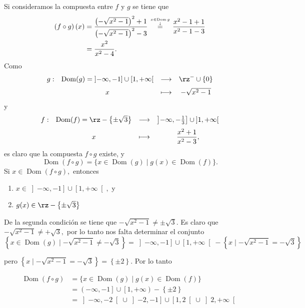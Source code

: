 \begin{sol}
Si consideramos la compuesta entre $f$ y $g$ se tiene que
\begin{align*}
\left(  f\circ g\right)  \left(  x\right)   &  =\dfrac{\left(  -\sqrt{x^{2}%
-1}\right)  ^{2}+1}{\left(  -\sqrt{x^{2}-1}\right)  ^{2}-3}\overset{%
\genfrac{}{}{0pt}{}{x\in\operatorname*{Dom}g}{\downarrow}%
}{=}\frac{x^{2}-1+1}{x^{2}-1-3}\\
&  =\frac{x^{2}}{x^{2}-4}.
\end{align*}
Como
\[%
\begin{array}
[c]{cccc}%
g: & \operatorname*{Dom}(g)=\left]  -\infty,-1\right]  \cup\left[
1,+\infty\right[  & \longrightarrow & \rz^{-}\cup\left\{  0\right\} \\
\vspace{-0.2cm} &  &  & \\
& x & \longmapsto & -\sqrt{x^{2}-1}%
\end{array}
\]
y
\[%
\begin{array}
[c]{cccc}%
f: & \operatorname*{Dom}(f)=\rz-\left\{  \pm\sqrt{3}\right\}  &
\longrightarrow & \left]  -\infty,-\frac{1}{3}\right]  \cup\left]
1,+\infty\right[ \\
\vspace{-0.2cm} &  &  & \\
& x & \longmapsto & \dfrac{x^{2}+1}{x^{2}-3},
\end{array}
\]
es claro que la compuesta $f\circ g$ existe, y%
\[
\operatorname*{Dom}\left(  f\circ g\right)  =\{x\in\operatorname*{Dom}(g)\mid
g(x)\in\operatorname*{Dom}(f)\}.
\]
Si $x\in\operatorname*{Dom}\left(  f\circ g\right)  ,$ entonces

\begin{enumerate}
\item $x\in\left]  -\infty,-1\right]  \cup\left[  1,+\infty\right[  ,$ y

\item $g(x)\in\rz-\left\{  \pm\sqrt{3}\right\}  $
\end{enumerate}

De la segunda condici\'{o}n se tiene que $-\sqrt{x^{2}-1}\neq\pm\sqrt{3}.$ Es
claro que $-\sqrt{x^{2}-1}\neq+\sqrt{3},$ por lo tanto nos falta determinar el
conjunto%
\[
\left\{  x\in\operatorname*{Dom}(g)\mid-\sqrt{x^{2}-1}\neq-\sqrt{3}\right\}
=\left]  -\infty,-1\right]  \cup\left[  1,+\infty\right[  -\left\{
x\mid-\sqrt{x^{2}-1}=-\sqrt{3}\right\}
\]


pero $\left\{  x\mid-\sqrt{x^{2}-1}=-\sqrt{3}\right\}  =\left\{  \pm2\right\}
.$ Por lo tanto%

\begin{align*}
\operatorname*{Dom}\left(  f\circ g\right)   &  =\{x\in\operatorname*{Dom}%
(g)\mid g(x)\in\operatorname*{Dom}(f)\}\\
&  =\left(  -\infty,-1\right]  \cup\left[  1,+\infty\right)  -\left\{
\pm2\right\} \\
&  =\left]  -\infty,-2\right[  \cup\left]  -2,-1\right]  \cup\left[
1,2\right[  \cup\left]  2,+\infty\right[
\end{align*}

\end{sol}

